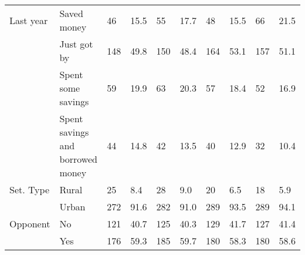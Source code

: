 \begin{table}
\begin{tabular}[t]{llllllllll}
Last year & Saved money & 46 & 15.5 & 55 & 17.7 & 48 & 15.5 & 66 & 21.5\\
 & Just got by & 148 & 49.8 & 150 & 48.4 & 164 & 53.1 & 157 & 51.1\\
 & Spent some savings & 59 & 19.9 & 63 & 20.3 & 57 & 18.4 & 52 & 16.9\\
 & Spent savings and
borrowed money & 44 & 14.8 & 42 & 13.5 & 40 & 12.9 & 32 & 10.4\\
Set. Type & Rural & 25 & 8.4 & 28 & 9.0 & 20 & 6.5 & 18 & 5.9\\
 & Urban & 272 & 91.6 & 282 & 91.0 & 289 & 93.5 & 289 & 94.1\\
Opponent & No & 121 & 40.7 & 125 & 40.3 & 129 & 41.7 & 127 & 41.4\\
 & Yes & 176 & 59.3 & 185 & 59.7 & 180 & 58.3 & 180 & 58.6\\
\bottomrule
\end{tabular}
\end{table}
